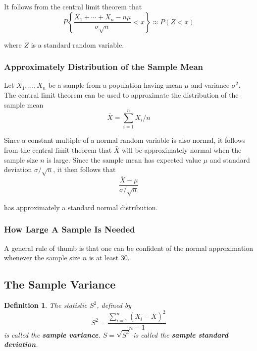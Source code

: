 \documentclass[12pt]{article}
\newtheorem{definition}[theorem]{Definition}
\begin{document}
It follows from the central limit theorem that
\begin{equation*}
  P \left\{ \frac {X_1 + \cdots + X_n - n\mu}{\sigma \sqrt{n}} < x \right\}
  \approx P(Z < x)
\end{equation*}

where $Z$ is a standard random variable.

\subsubsection{Approximately Distribution of the Sample Mean}

Let $X_1, \dots, X_n$ be a sample from a population having mean $\mu$ and variance $\sigma^2$. The central limit theorem can be used to approximate the distribution of the sample mean
\begin{equation*}
  \bar {X} = \sum_{i=1}^n X_i / n
\end{equation*}

Since a constant multiple of a normal random variable is also normal, it follows from the central limit theorem that $\bar{X}$ will be approximately normal when the sample size $n$ is large. Since the sample mean has expected value $\mu$ and standard deviation $\sigma / \sqrt{n}$, it then follows that
\begin{equation*}
  \frac {\bar{X} - \mu}{\sigma / \sqrt{n}}
\end{equation*}

has approximately a standard normal distribution.

\subsubsection{How Large A Sample Is Needed}

A general rule of thumb is that one can be confident of the normal approximation whenever the sample size $n$ is at least 30.

\subsection{The Sample Variance}

\begin{definition}
  The statistic $S^2$, defined by
  \begin{equation*}
    S^2 = \frac {\sum_{i=1}^n (X_i - \bar{X})^2}{n-1}
  \end{equation*}
  is called the \textbf{sample variance}. $S = \sqrt{S^2}$ is called the \textbf{sample standard deviation}.
\end{definition}
\end{document}
